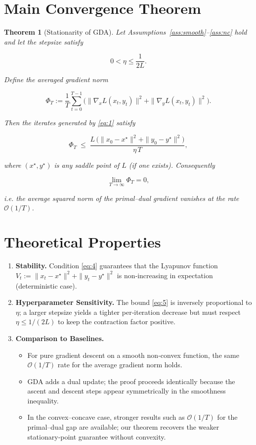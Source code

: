 \documentclass{article}
\newtheorem{theorem}{Theorem}
\begin{document}
\section*{Main Convergence Theorem}
\begin{theorem}[Stationarity of GDA]\label{thm:main}
Let Assumptions~\ref{ass:smooth}–\ref{ass:nc} hold and let the stepsize satisfy  

\[
0<\eta\le \frac{1}{2L}.
\tag{4}
\]

Define the averaged gradient norm  

\[
\Phi_T:=\frac{1}{T}\sum_{t=0}^{T-1}
\Big(\|\nabla_x L(x_t,y_t)\|^{2}+\|\nabla_y L(x_t,y_t)\|^{2}\Big).
\]

Then the iterates generated by \eqref{eq:1} satisfy  

\[
\Phi_T \;\le\; \frac{L\,\big(\|x_{0}-x^{\star}\|^{2}+\|y_{0}-y^{\star}\|^{2}\big)}{\eta\,T},
\tag{5}
\]

where \((x^{\star},y^{\star})\) is any saddle point of \(L\) (if one exists). Consequently  

\[
\lim_{T\to\infty}\Phi_T =0,
\]

i.e. the average squared norm of the primal–dual gradient vanishes at the rate \(\mathcal{O}(1/T)\).
\end{theorem}

\section*{Theoretical Properties}
\begin{enumerate}[label=\arabic*.]
\item \textbf{Stability.} Condition \eqref{eq:4} guarantees that the Lyapunov function  
\(V_t:=\|x_t-x^{\star}\|^{2}+\|y_t-y^{\star}\|^{2}\) is non‑increasing in expectation (deterministic case).  

\item \textbf{Hyperparameter Sensitivity.} The bound \eqref{eq:5} is inversely proportional to \(\eta\); a larger stepsize yields a tighter per‑iteration decrease but must respect \(\eta\le 1/(2L)\) to keep the contraction factor positive.  

\item \textbf{Comparison to Baselines.}
\begin{itemize}
\item For pure gradient descent on a smooth non‑convex function, the same \(\mathcal{O}(1/T)\) rate for the average gradient norm holds.  
\item GDA adds a dual update; the proof proceeds identically because the ascent and descent steps appear symmetrically in the smoothness inequality.  
\item In the convex–concave case, stronger results such as \(\mathcal{O}(1/T)\) for the primal–dual gap are available; our theorem recovers the weaker stationary‑point guarantee without convexity.
\end{itemize}
\end{enumerate}
\end{document}
